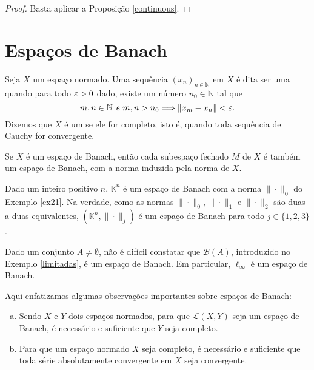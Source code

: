 \begin{proof}
Basta aplicar a Proposição \ref{continuous}.
\end{proof}

\section{Espaços de Banach}

\begin{definition}
Seja $X$ um espaço normado. Uma sequência $(x_n)_{n\in \mathbb N}$ em $X$ é dita ser uma   quando para todo $\varepsilon>0$ dado, existe um número $n_0\in \mathbb N$ tal que 
\begin{equation*}
    m,n\in \mathbb N \emph{ e } m,n>n_0 \Longrightarrow \|x_m-x_n\|< \varepsilon.
\end{equation*}
Dizemos que $X$ é um   se ele for completo, isto é, quando toda sequência de Cauchy for  convergente.
\end{definition}

\begin{remark}\label{subespaço}
Se $X$ é um {\color{orange}espaço de Banach}, então cada subespaço fechado $M$ de $X$ é também um espaço de Banach, com a norma induzida pela norma de $X$.
\end{remark}

\begin{example}
Dado um inteiro positivo $n$, $\mathbb K ^n$ é um espaço de Banach com a norma $\|\cdot\|_0$ do Exemplo \ref{ex21}. Na verdade, como as normas $\| \cdot\|_0$, $\| \cdot\|_1$ e $\| \cdot\|_2$ são duas a duas equivalentes, $(\mathbb K ^n ,\| \cdot\|_j )$ é um espaço de Banach para todo $j\in \{1,2,3\}$. 
\end{example}

\begin{example}
Dado um conjunto $A\neq \emptyset$, não  é difícil constatar que $\mathcal B (A)$, introduzido no Exemplo \ref{limitadas}, é um espaço de Banach. Em particular, $\ell _{\infty}$ é um espaço de Banach.
\end{example}



\begin{remark}\label{propbanach}
    Aqui enfatizamos algumas observações importantes sobre espaços de Banach:
\begin{enumerate}[(a)]
\item Sendo $X$ e $Y$ dois espaços normados, para que $\mathcal L (X,Y)$ seja um espaço de Banach, é necessário e suficiente que $Y$ seja completo.
\item Para que um espaço normado $X$ seja completo, é necessário e suficiente que toda série absolutamente convergente em $X$ seja convergente.
\end{enumerate}
\end{remark}

